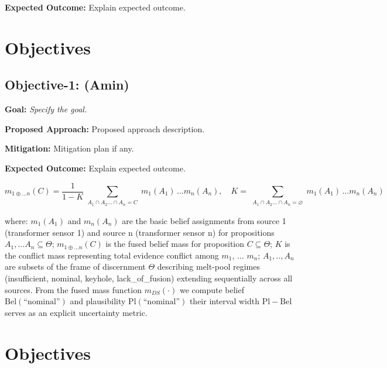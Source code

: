 \documentclass[11pt]{article}
\begin{document}
\textbf{\textcolor{FlyersRed}{{Expected Outcome:}}}
Explain expected outcome. 

\section{Objectives}
\label{sec:objectives}
\subsection{Objective-1: (Amin)}
\label{sec:object1}


\noindent
\textbf{\textcolor{FlyersRed}{{Goal:}}}
\textit{Specify the goal.}



\noindent
\textbf{\textcolor{FlyersRed}{{Proposed Approach:}}}
Proposed approach description.

\noindent
\textbf{\textcolor{FlyersRed}{{Mitigation:}}}
Mitigation plan if any.


\textbf{\textcolor{FlyersRed}{{Expected Outcome:}}}
Explain expected outcome. 

\begin{equation}\label{eq:example_equation}
  m_{1\oplus...n}(C) 
  = \frac{1}{1 - K} \sum_{\substack{A_1 \cap A_2 ... \cap A_n = C}} m_1(A_1)\,...m_n(A_n),
  \quad
  K = \sum_{\substack{A_1 \cap A_2 ... \cap A_n = \varnothing}} m_1(A_1)\,...m_n(A_n)
\end{equation}

\noindent where: $m_1(A_1)$ and $m_n(A_n)$ are the basic belief assignments from source 1 (transformer sensor 1) and source n (transformer sensor n) for propositions $A_1, ... A_n \subseteq \Theta$; $m_{1\oplus...n}(C)$ is the fused belief mass for proposition $C \subseteq \Theta$; $K$ is the conflict mass representing total evidence conflict among $m_1$, ... $m_n$; $A_1, .., A_n$ are subsets of the frame of discernment $\Theta$ describing melt-pool regimes (insufficient, nominal, keyhole, lack\_of\_fusion) extending sequentially across all sources. From the fused mass function $m_{DS}(\cdot)$ we compute belief $\mathrm{Bel}(\text{``nominal''})$ and plausibility $\mathrm{Pl}(\text{``nominal''})$ their interval width $\mathrm{Pl}-\mathrm{Bel}$ serves as an explicit uncertainty metric.

\section{Objectives}
\label{sec:objectives}
\end{document}
